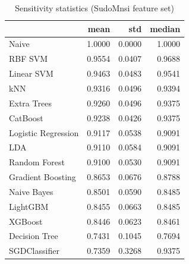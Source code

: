 \begin{table}
\caption{Sensitivity statistics (SudoMnsi feature set)}
\label{tab:sensitivity_SudoMnsi_stats}
\begin{tabular}{lrrr}
\toprule
 & mean & std & median \\
\midrule
Naive & 1.0000 & 0.0000 & 1.0000 \\
RBF SVM & 0.9554 & 0.0407 & 0.9688 \\
Linear SVM & 0.9463 & 0.0483 & 0.9541 \\
kNN & 0.9316 & 0.0496 & 0.9394 \\
Extra Trees & 0.9260 & 0.0496 & 0.9375 \\
CatBoost & 0.9238 & 0.0426 & 0.9375 \\
Logistic Regression & 0.9117 & 0.0538 & 0.9091 \\
LDA & 0.9110 & 0.0584 & 0.9091 \\
Random Forest & 0.9100 & 0.0530 & 0.9091 \\
Gradient Boosting & 0.8653 & 0.0676 & 0.8788 \\
Naive Bayes & 0.8501 & 0.0590 & 0.8485 \\
LightGBM & 0.8455 & 0.0663 & 0.8485 \\
XGBoost & 0.8446 & 0.0623 & 0.8461 \\
Decision Tree & 0.7431 & 0.1045 & 0.7694 \\
SGDClassifier & 0.7359 & 0.3268 & 0.9375 \\
\bottomrule
\end{tabular}
\end{table}
